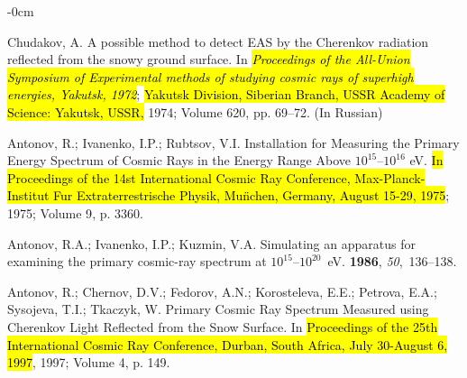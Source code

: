 \documentclass[universe,article,accept,moreauthors,pdftex]{Definitions/mdpi}
\begin{document}
\begin{adjustwidth}{-\extralength}{0cm}


%
\begin{thebibliography}{999}

Chudakov, A.
\newblock A possible method to detect {EAS} by the {Cherenkov} radiation reflected from the snowy ground surface. 
\newblock  
In \emph{\hl{ Proceedings of the All-Union Symposium of Experimental methods of studying cosmic rays of superhigh energies, Yakutsk, 1972}}; \hl{Yakutsk Division, Siberian Branch, USSR Academy of Science: Yakutsk, USSR,} 1974; Volume 620, pp. 69--72. (In {Russian}) %

Antonov, R.; Ivanenko, I.P.; Rubtsov, V.I.
\newblock Installation for Measuring the Primary Energy Spectrum of Cosmic Rays
  in the Energy Range Above $10^{15}$--$10^{16}$ eV.
\newblock  \hl{In Proceedings of the 14st International Cosmic Ray Conference, Max-Planck-Institut Fur Extraterrestrische Physik, Mu\"nchen, Germany, August 15-29, 1975}; {1975}; {Volume 9}, p. 3360. %

{Antonov, R.A.; Ivanenko, I.P.; Kuzmin, V.A.}
\newblock Simulating an apparatus for examining the primary cosmic-ray spectrum
  at $10^{15}$--$10^{20}$~{eV}.
  {\bf 1986}, {\em 50},~136--138.

Antonov, R.; Chernov, D.V.; Fedorov, A.N.; Korosteleva, E.E.; Petrova, E.A.; Sysojeva, T.I.; Tkaczyk, W.
\newblock Primary Cosmic Ray Spectrum Measured using Cherenkov Light Reflected
  from the Snow Surface.
\newblock In \hl{Proceedings of the 25th International Cosmic Ray Conference, Durban, South Africa, July 30-August 6, 1997}, { 1997}; {Volume 4}, p. 149.%


\end{thebibliography}
\end{adjustwidth}
\end{document}
